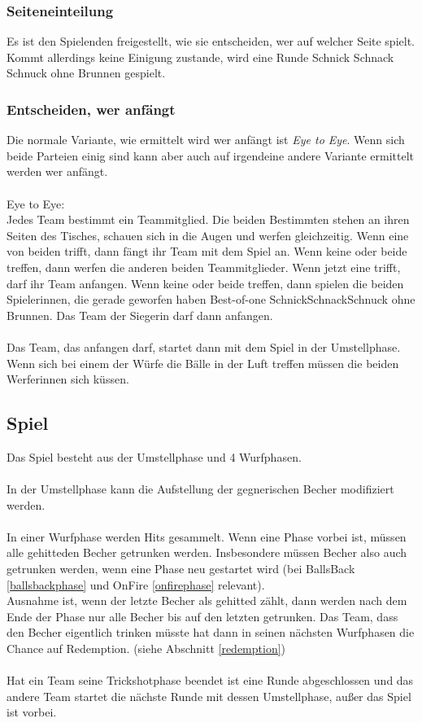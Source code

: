 \documentclass[a5paper, 12pt]{book}
\begin{document}
\subsubsection{Seiteneinteilung}\label{seiteneinteilung}
Es ist den Spielenden freigestellt, wie sie entscheiden, wer auf welcher Seite spielt. Kommt allerdings keine Einigung zustande, wird eine Runde Schnick Schnack Schnuck ohne Brunnen gespielt.
\subsubsection{Entscheiden, wer anfängt}\label{entscheidenweranfängt}
Die normale Variante, wie ermittelt wird wer anfängt ist \textit{Eye to Eye}. Wenn sich beide Parteien einig sind kann aber auch auf irgendeine andere Variante ermittelt werden wer anfängt. \\\\
Eye to Eye:\\
Jedes Team bestimmt ein Teammitglied. Die beiden Bestimmten stehen an ihren Seiten des Tisches, schauen sich in die Augen und werfen gleichzeitig. Wenn eine von beiden trifft, dann fängt ihr Team mit dem Spiel an. Wenn keine oder beide treffen, dann werfen die anderen beiden Teammitglieder. Wenn jetzt eine trifft, darf ihr Team anfangen. Wenn keine oder beide treffen, dann spielen die beiden Spielerinnen, die gerade geworfen haben Best-of-one SchnickSchnackSchnuck ohne Brunnen. Das Team der Siegerin darf dann anfangen. \\\\Das Team, das anfangen darf, startet dann mit dem Spiel in der Umstellphase.\\
Wenn sich bei einem der Würfe die Bälle in der Luft treffen müssen die beiden Werferinnen sich küssen.
\subsection{Spiel}\label{spiel}
Das Spiel besteht aus der Umstellphase und 4 Wurfphasen. \\\\
In der Umstellphase kann die Aufstellung der gegnerischen Becher modifiziert werden. \\\\
In einer Wurfphase werden Hits gesammelt. Wenn eine Phase vorbei ist, müssen alle gehitteden Becher getrunken werden. Insbesondere müssen Becher also auch getrunken werden, wenn eine Phase neu gestartet wird (bei BallsBack \ref{ballsbackphase} und OnFire \ref{onfirephase} relevant).\\
 Ausnahme ist, wenn der letzte Becher als gehitted zählt, dann werden nach dem Ende der Phase nur alle Becher bis auf den letzten getrunken. Das Team, dass den Becher eigentlich trinken müsste hat dann in seinen nächsten Wurfphasen die Chance auf Redemption. (siehe Abschnitt \ref{redemption})\\\\
Hat ein Team seine Trickshotphase beendet ist eine Runde abgeschlossen und das andere Team startet die nächste Runde mit dessen Umstellphase, außer das Spiel ist vorbei.\\\\
\end{document}
